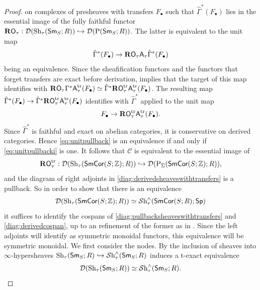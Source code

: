 \documentclass[reqno]{amsart}
\numberwithin{equation}{section}\theoremstyle{thms}
\theoremstyle{defn}
\newcommand{\nP}{\tn{P}}
\newcommand{\bZ}{\mathbb{Z}}
\newcommand{\cC}{\mathcal{C}}
\newcommand{\cD}{\mathcal{D}}
\newcommand{\tn}[1]{\textnormal{#1}}
\newcommand{\tsf}[1]{\textsf{\textup{#1}}}
\newcommand{\tbf}[1]{\textbf{\textup{#1}}}
\newcommand{\mcal}[1]{\mathcal{#1}}
\newcommand{\sheaves}{\mcal{S}\tn{h}}
\newcommand{\spec}{\tsf{Sp}}
\newcommand{\sms}{\tsf{Sm}_S}
\newcommand{\corsms}[1]{\tsf{SmCor}(S;#1)}
\begin{document}
\begin{proof}
on complexes of presheaves with transfers $F_\bullet$ such that $\hat{\Gamma}^*(F_\bullet)$ lies in the essential image of the fully faithful functor $\tbf{R}\tsf{O}_{\tau}: \cD(\tn{Sh}_{\tau}(\sms;R)) \hookrightarrow \cD(\nP(\sms;R))$. The latter is equivalent to the unit map 
\begin{align}\label{eq:unitpullback}
\hat{\Gamma}^*(F_\bullet) \to \tbf{R}\tsf{O}_{\tau}\tsf{A}_{\tau}\hat{\Gamma}^*(F_\bullet)
\end{align}
being an equivalence. Since the sheafification functors and the functors that forget transfers are exact before derivation, \cite[Proposition 10.3.9]{cd19} implies that the target of this map identifies with $\tbf{R}\tsf{O}_{\tau}\Gamma^*\tsf{A}_{\tau}^{\tn{tr}}(F_\bullet) \simeq \hat{\Gamma}^*\tbf{R}\tsf{O}_{\tau}^{\tn{tr}}\tsf{A}_{\tau}^{\tn{tr}}(F_\bullet)$. The resulting map $\hat{\Gamma}^*(F_\bullet) \to \hat{\Gamma}^*\tbf{R}\tsf{O}_{\tau}^{\tn{tr}}\tsf{A}_{\tau}^{\tn{tr}}(F_\bullet)$ identifies with $\hat{\Gamma}^*$ applied to the unit map
\begin{align}\label{eq:unitpullbacki}
F_\bullet \to \tbf{R}\tsf{O}_{\tau}^{\tn{tr}}\tsf{A}_{\tau}^{\tn{tr}}(F_\bullet).
\end{align}
Since $\hat{\Gamma}^*$ is faithful and exact on abelian categories, it is conservative on derived categories. Hence \ref{eq:unitpullback} is an equivalence if and only if \ref{eq:unitpullbacki} is one. It follows that $\cC$ is equivalent to the essential image of 
$$\tbf{R}\tsf{O}_{\tau}^{\tn{tr}}: \cD(\tn{Sh}_{\tau}(\corsms{\bZ};R)) \hookrightarrow \cD(\nP_{\Sigma}(\corsms{\bZ};R)),$$ 
and the diagram of right adjoints in \ref{diag:derivedsheaveswithtransfers} is a pullback. So in order to show that there is an equivalence 
$$\cD(\tn{Sh}_{\tau}(\corsms{\bZ};R)) \simeq \sheaves_{\tau}^{\wedge}(\corsms{R};\spec)$$
it suffices to identify the cospans of \ref{diag:pullbacksheaveswithtransfers} and \ref{diag:derivedcospan}, up to an refinement of the former as in . Since the left adjoints will identify as symmetric monoidal functors, this equivalence will be symmetric monoidal. We first consider the nodes. By \cite[Corollary 2.1.2.3]{lur18} the inclusion  of sheaves into $\infty$-hypersheaves $\tn{Sh}_{\tau}(\sms;R) \hookrightarrow \sheaves_{\tau}^{\wedge}(\sms;R)$ induces a t-exact equivalence
\begin{equation}\label{eq:derivedsheaves}
\cD(\tn{Sh}_{\tau}(\sms;R)) \simeq \sheaves_{\tau}^{\wedge}(\sms;R).
\end{equation}

\end{proof}
\end{document}

